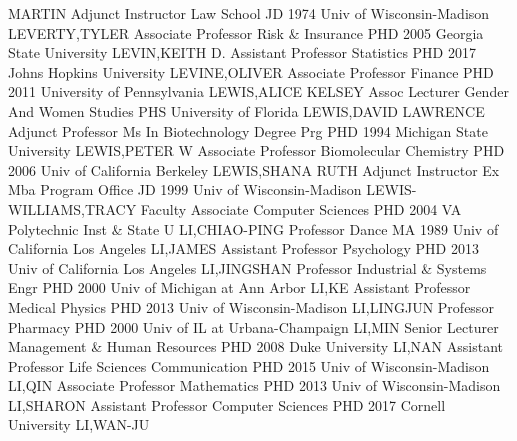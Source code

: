 \documentclass[
]{article}
\begin{document}
MARTIN \textbar{}  \textbar Adjunct Instructor \textbar Law
School \textbar JD 1974 Univ of Wisconsin-Madison \textbar LEVERTY,TYLER
\textbar{}  \textbar Associate Professor \textbar Risk \&
Insurance \textbar PHD 2005 Georgia State University
\textbar LEVIN,KEITH D. \textbar{}  \textbar Assistant
Professor \textbar Statistics \textbar PHD 2017 Johns Hopkins University
\textbar LEVINE,OLIVER \textbar{}  \textbar Associate
Professor \textbar Finance \textbar PHD 2011 University of Pennsylvania
\textbar LEWIS,ALICE KELSEY \textbar{}  \textbar Assoc
Lecturer \textbar Gender And Women Studies \textbar PHS University of
Florida \textbar LEWIS,DAVID LAWRENCE \textbar{} 
\textbar Adjunct Professor \textbar Ms In Biotechnology Degree Prg
\textbar PHD 1994 Michigan State University \textbar LEWIS,PETER W
\textbar{}  \textbar Associate Professor
\textbar Biomolecular Chemistry \textbar PHD 2006 Univ of California
Berkeley \textbar LEWIS,SHANA RUTH \textbar{} 
\textbar Adjunct Instructor \textbar Ex Mba Program Office \textbar JD
1999 Univ of Wisconsin-Madison \textbar LEWIS-WILLIAMS,TRACY \textbar{}
 \textbar Faculty Associate \textbar Computer Sciences
\textbar PHD 2004 VA Polytechnic Inst \& State U \textbar LI,CHIAO-PING
\textbar{}  \textbar Professor \textbar Dance \textbar MA
1989 Univ of California Los Angeles \textbar LI,JAMES \textbar{}
 \textbar Assistant Professor \textbar Psychology
\textbar PHD 2013 Univ of California Los Angeles \textbar LI,JINGSHAN
\textbar{}  \textbar Professor \textbar Industrial \&
Systems Engr \textbar PHD 2000 Univ of Michigan at Ann Arbor
\textbar LI,KE \textbar{}  \textbar Assistant Professor
\textbar Medical Physics \textbar PHD 2013 Univ of Wisconsin-Madison
\textbar LI,LINGJUN \textbar{}  \textbar Professor
\textbar Pharmacy \textbar PHD 2000 Univ of IL at Urbana-Champaign
\textbar LI,MIN \textbar{}  \textbar Senior Lecturer
\textbar Management \& Human Resources \textbar PHD 2008 Duke University
\textbar LI,NAN \textbar{}  \textbar Assistant Professor
\textbar Life Sciences Communication \textbar PHD 2015 Univ of
Wisconsin-Madison \textbar LI,QIN \textbar{} 
\textbar Associate Professor \textbar Mathematics \textbar PHD 2013 Univ
of Wisconsin-Madison \textbar LI,SHARON \textbar{} 
\textbar Assistant Professor \textbar Computer Sciences \textbar PHD
2017 Cornell University \textbar LI,WAN-JU \textbar{} 
\end{document}
